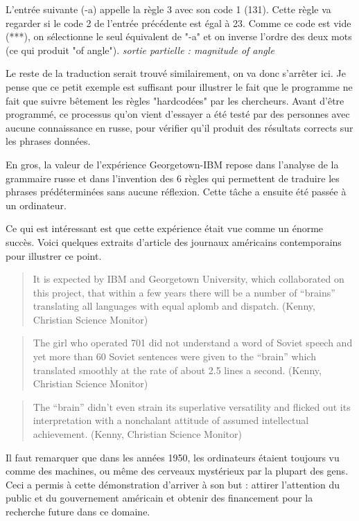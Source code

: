 \documentclass[11pt, a4paper]{report}
\begin{document}
L'entrée suivante (-a) appelle la règle 3 avec son code 1 (131). Cette règle va regarder si le 
code 2 de l'entrée précédente est égal à 23. Comme ce code est vide (***), on sélectionne le seul 
équivalent de "-a" et on inverse l'ordre des deux mots (ce qui produit "of angle"). \newline
\textit{sortie partielle : magnitude of angle}

Le reste de la traduction serait trouvé similairement, on va donc s'arrêter ici. Je pense que ce 
petit exemple est suffisant pour illustrer le fait que le programme ne fait que suivre bêtement les 
règles "hardcodées" par les chercheurs. Avant d'être programmé, ce processus qu'on vient d'essayer 
a été testé par des personnes avec aucune connaissance en russe, pour vérifier qu'il produit des 
résultats corrects sur les phrases données. 

En gros, la valeur de l'expérience Georgetown-IBM repose dans l'analyse de la grammaire russe et dans 
l'invention des 6 règles qui permettent de traduire les phrases prédéterminées sans aucune réflexion. 
Cette tâche a ensuite été passée à un ordinateur. 

Ce qui est intéressant est que cette expérience était vue comme un énorme succès. Voici quelques 
extraits d'article des journaux américains contemporains pour illustrer ce point.
\begin{quote} 
It is expected by IBM and Georgetown University, which collaborated on this project,
that within a few years there will be a number of “brains” translating all languages
with equal aplomb and dispatch. (Kenny, Christian Science Monitor)
\end{quote}

\begin{quote}
The girl who operated 701 did not understand a word of Soviet speech and yet more
than 60 Soviet sentences were given to the “brain” which translated smoothly at the
rate of about 2.5 lines a second. (Kenny, Christian Science Monitor)
\end{quote}

\begin{quote}
The “brain” didn’t even strain its superlative versatility and flicked out its
interpretation with a nonchalant attitude of assumed intellectual achievement. (Kenny,
Christian Science Monitor)
\end{quote}

Il faut remarquer que dans les années 1950, les ordinateurs étaient toujours vu comme des machines, ou 
même des cerveaux mystérieux par la plupart des gens. Ceci a permis à cette démonstration d'arriver à 
son but : attirer l'attention du public et du gouvernement américain et obtenir des financement pour 
la recherche future dans ce domaine. 
  
\end{document}
